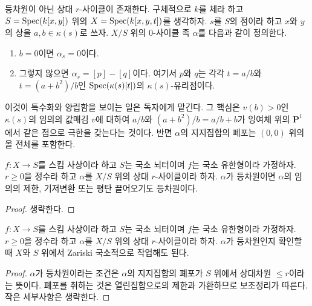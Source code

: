 \begin{example}
\label{example-not-equidimensional}
\begin{reference}
\cite[Example 3.1.9]{SV}
\end{reference}
등차원이 아닌 상대 $r$-사이클이 존재한다. 구체적으로 $k$를 체라
하고 $S = \mathop{\mathrm{Spec}}(k[x, y])$ 위의 $X = \mathop{\mathrm{Spec}}(k[x, y, t])$를 생각하자.
$s$를 $S$의 점이라 하고 $x$와 $y$의 상을 $a, b \in \kappa(s)$로
쓰자. $X/S$ 위의 $0$-사이클 족 $\alpha$를 다음과 같이 정의한다.
\begin{enumerate}
\item $b = 0$이면 $\alpha_s = 0$이다.
\item 그렇지 않으면 $\alpha_s = [p] - [q]$이다. 여기서 $p$와 $q$는
각각 $t = a/b$와 $t = (a + b^2)/b$인
$\mathop{\mathrm{Spec}}(\kappa(s)[t])$의 $\kappa(s)$-유리점이다.
\end{enumerate}
이것이 특수화와 양립함을 보이는 일은 독자에게 맡긴다. 그 핵심은
$v(b) > 0$인 $\kappa(s)$의 임의의 값매김 $v$에 대하여 $a/b$와
$(a + b^2)/b = a/b + b$가 잉여체 위의 $\mathbf{P}^1$에서 같은 점으로
극한을 갖는다는 것이다. 반면 $\alpha$의 지지집합의 폐포는
$(0, 0)$ 위의 올 전체를 포함한다.
\end{example}

\begin{lemma}
\label{lemma-equidimensional-functoriality}
$f : X \to S$를 스킴 사상이라 하고 $S$는 국소 뇌터이며 $f$는
국소 유한형이라 가정하자. $r \geq 0$을 정수라 하고 $\alpha$를
$X/S$ 위의 상대 $r$-사이클이라 하자. $\alpha$가 등차원이면
$\alpha$의 임의의 제한, 기저변환 또는 평탄 끌어오기도 등차원이다.
\end{lemma}

\begin{proof}
생략한다.
\end{proof}

\begin{lemma}
\label{lemma-check-equidimensional}
$f : X \to S$를 스킴 사상이라 하고 $S$는 국소 뇌터이며 $f$는
국소 유한형이라 가정하자. $r \geq 0$을 정수라 하고 $\alpha$를
$X/S$ 위의 상대 $r$-사이클이라 하자. $\alpha$가 등차원인지 확인할
때 $X$와 $S$ 위에서 Zariski 국소적으로 작업해도 된다.
\end{lemma}

\begin{proof}
$\alpha$가 등차원이라는 조건은 $\alpha$의 지지집합의 폐포가
$S$ 위에서 상대차원 $\leq r$이라는 뜻이다. 폐포를 취하는 것은
열린집합으로의 제한과 가환하므로 보조정리가 따른다. 작은
세부사항은 생략한다.
\end{proof}

